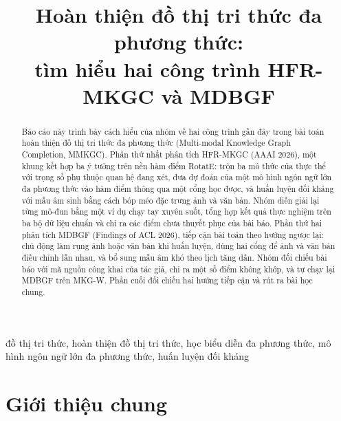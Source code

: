 \documentclass[conference,a4paper]{IEEEtran}
\begin{document}
\title{Hoàn thiện đồ thị tri thức đa phương thức:\\
tìm hiểu hai công trình HFR-MKGC và MDBGF}

\author{
}

\maketitle

\begin{abstract}
Báo cáo này trình bày cách hiểu của nhóm về hai công trình gần đây trong bài toán hoàn thiện đồ thị tri thức đa phương thức (Multi-modal Knowledge Graph Completion, MMKGC). Phần thứ nhất phân tích HFR-MKGC (AAAI 2026), một khung kết hợp ba ý tưởng trên nền hàm điểm RotatE: trộn ba mô thức của thực thể với trọng số phụ thuộc quan hệ đang xét, đưa dự đoán của một mô hình ngôn ngữ lớn đa phương thức vào hàm điểm thông qua một cổng học được, và huấn luyện đối kháng với mẫu âm sinh bằng cách bóp méo đặc trưng ảnh và văn bản. Nhóm diễn giải lại từng mô-đun bằng một ví dụ chạy tay xuyên suốt, tổng hợp kết quả thực nghiệm trên ba bộ dữ liệu chuẩn và chỉ ra các điểm chưa thuyết phục của bài báo. Phần thứ hai phân tích MDBGF (Findings of ACL 2026), tiếp cận bài toán theo hướng ngược lại: chủ động làm rụng ảnh hoặc văn bản khi huấn luyện, dùng hai cổng để ảnh và văn bản điều chỉnh lẫn nhau, và bổ sung mẫu âm khó theo lịch tăng dần. Nhóm đối chiếu bài báo với mã nguồn công khai của tác giả, chỉ ra một số điểm không khớp, và tự chạy lại MDBGF trên MKG-W. Phần cuối đối chiếu hai hướng tiếp cận và rút ra bài học chung.
\end{abstract}

\begin{IEEEkeywords}
đồ thị tri thức, hoàn thiện đồ thị tri thức, học biểu diễn đa phương thức, mô hình ngôn ngữ lớn đa phương thức, huấn luyện đối kháng
\end{IEEEkeywords}

\section{Giới thiệu chung}
\label{sec:intro}
\end{document}
